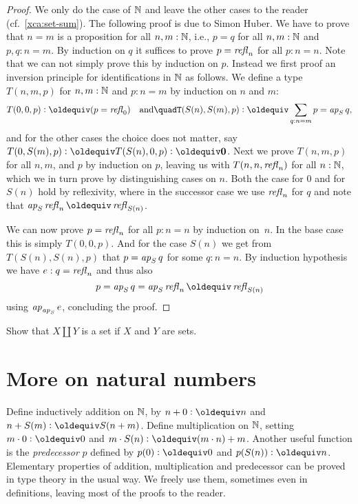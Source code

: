 \begin{proof}
  We only do the case of $\mathbb{N}$ and leave the other cases to the reader
  (cf.\ \cref{xca:set-sum}). The following proof is due to Simon Huber.
  We have to prove that $n=m$ is a
  proposition for all $n,m:\mathbb{N}$, i.e., $p = q$ for all $n,m : \mathbb{N}$ and
  $p, q : n = m$.  By induction on $q$ it suffices to prove $p = \mathop{{\it refl}_{n}}$ for all $p : n = n$.  Note that we can not simply prove this by
  induction on $p$.  Instead we first proof an inversion principle for
  identifications in $\mathbb{N}$ as follows.  We define a type $T(n,m,p)$
  for $n, m : \mathbb{N}$ and $p : n = m$ by induction on $n$ and $m$:
  \[
    T(0,0,p) \defeq (p = \refl{0})%
    \quad \text{and} \quad%
    T(S(n), S(m), p) \defeq \sum_{q : n = m} p = \ap S q,%
  \]
  and for the other cases the choice does not matter, say $T(0, S(m),
  p) \defeq T(S(n), 0 ,p) \defeq \bn{0}$.  Next we prove $T(n,m,p)$
  for all $n,m$, and $p$ by induction on $p$, leaving us with
  $T(n,n,\mathop{{\it refl}_{n}})$ for all $n : \mathbb{N}$, which we in turn prove by
  distinguishing cases on $n$.  Both the case for $0$ and for $S(n)$
  hold by reflexivity, where in the successor case we use $\mathop{{\it refl}_{n}}$
  for $q$ and note that $\ap S \refl{n} \jdeq \refl{S(n)}$.

  We can now prove $p = \mathop{{\it refl}_{n}}$ for all $p : n = n$ by induction
  on~$n$.  In the base case this is simply $T(0,0,p)$.  And for the
  case $S(n)$ we get from $T(S(n),S(n),p)$ that $p = \mathop{{\it ap}_{S}} q$ for
  some $q : n = n$.  By induction hypothesis we have $e : q =
  \mathop{{\it refl}_{n}}$ and thus also
  \[
    p = \ap{S} q = \ap{S} \refl{n} \jdeq \refl{S (n)}
  \]
  using $\mathop{{\it ap}_{\mathop{{\it ap}_{S}}}} e$, concluding the proof.
\end{proof}

\begin{xca}\label{xca:set-sum}
Show that $X\amalg Y$ is a set if $X$ and $Y$ are sets.
\end{xca}

\section{More on natural numbers}
\label{sec:more-on-N}

Define inductively addition on $\mathbb{N}$,
by $n+0\defeq n$ and $n+S(m)\defeq S(n+m)$. Define
multiplication on $\mathbb{N}$, setting $m\cdot 0\defeq 0$ and 
$m\cdot S(n)\defeq (m\cdot n) + m$. 
Another useful function is the \emph{predecessor} $p$ defined by
$p(0)\defeq 0$ and $p(S(n))\defeq n$.
Elementary properties of addition, multiplication and predecessor
can be proved in type theory in the usual way.
We freely use them, sometimes even in definitions, leaving most of the
proofs to the reader.

